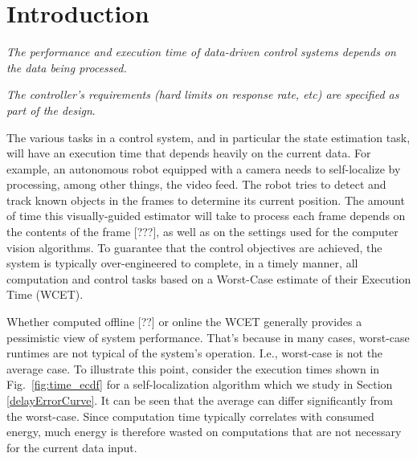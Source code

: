 \section{Introduction}
\label{introduction}

\emph{The performance and execution time of data-driven control systems depends on the data being processed.}

\emph{The controller's requirements (hard limits on response rate, etc) are specified as part of the design}.

The various tasks in a control system, and in particular the state estimation task, will have an execution time that depends heavily on the current data.
For example, an autonomous robot equipped with a camera needs to self-localize by processing, among other things, the video feed.
The robot tries to detect and track known objects in the frames to determine its current position.
The amount of time this visually-guided estimator will take to process each frame depends on the contents of the frame [???], as well as on the settings used for the computer vision algorithms.
To guarantee that the control objectives are achieved, the system is typically over-engineered to complete, in a timely manner, all computation and control tasks based on a Worst-Case estimate of their Execution Time (WCET).

Whether computed offline [??] or online \cite{hendsethB12_OnlineWCET} the WCET generally provides a pessimistic view of system performance.
That's because in many cases, worst-case runtimes are not typical of the system's operation.
I.e., worst-case is not the average case.
To illustrate this point, consider the execution times shown in Fig.~\ref{fig:time_ecdf} for a self-localization algorithm which we study in Section \ref{delayErrorCurve}.
It can be seen that the average can differ significantly from the worst-case.
Since computation time typically correlates with consumed energy, much energy is therefore wasted on computations that are not necessary for the current data input.

